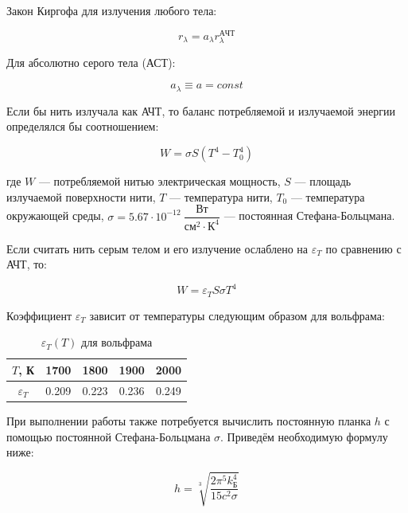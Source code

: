 \documentclass[a4paper, 12pt]{article}
\begin{document}
Закон Киргофа для излучения любого тела:

\begin{equation}
    r_{\lambda} = a_{\lambda} r_{\lambda}^{АЧТ}
\end{equation}

Для абсолютно серого тела (АСТ):

\begin{equation}
    a_{\lambda} \equiv a = const
\end{equation}

Если бы нить излучала как АЧТ, то баланс потребляемой и излучаемой энергии определялся бы соотношением:

\begin{equation}
    W = \sigma S (T^4 - T_0^4)
\end{equation}

где $W$ --- потребляемой нитью электрическая мощность, $S$ --- площадь излучаемой поверхности нити, $T$ --- температура нити, $T_0$ --- температура окружающей среды, $\sigma = 5.67 \cdot 10^{-12} ~ \dfrac{Вт}{см^2 \cdot К^4}$ --- постоянная Стефана-Больцмана.

Если считать нить серым телом и его излучение ослаблено на $\varepsilon_T$ по сравнению с АЧТ, то:

\begin{equation} \label{eq:s-b}
    W = \varepsilon_T S \sigma T^4
\end{equation}

Коэффициент $\varepsilon_T$ зависит от температуры следующим образом для вольфрама:

\begin{table}[H]
    \centering
    \begin{tabular}{|c|c|c|c|c|}
        \hline
        $T$, К  &   1700 &  1800 &  1900 &  2000 \\ \hline
        $\varepsilon_T$ & 0.209 & 0.223 & 0.236 & 0.249 \\ \hline
    \end{tabular}
    \caption {$\varepsilon_T (T)$ для вольфрама}
    \label{tab:epsT}
\end{table}

При выполнении работы также потребуется вычислить постоянную планка $h$ с помощью постоянной Стефана-Больцмана $\sigma$. Приведём необходимую формулу ниже:

\begin{equation} \label{eq:h-sigma}
    h = \sqrt[3]{\frac{2 \pi^5 k_Б^4}{15 c^2 \sigma}}
\end{equation}
\end{document}
